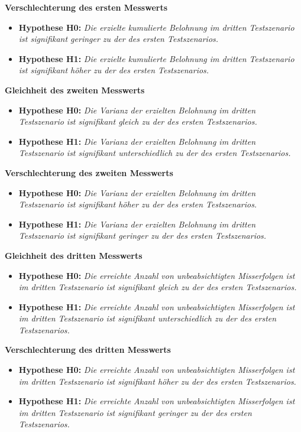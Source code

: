 \textbf{Verschlechterung des ersten Messwerts}
\begin{itemize}
    \item \textbf{Hypothese H0:} \textit{Die erzielte kumulierte Belohnung im dritten Testszenario ist signifikant geringer zu der des ersten Testszenarios.}
    \item \textbf{Hypothese H1:} \textit{Die erzielte kumulierte Belohnung im dritten Testszenario ist signifikant höher zu der des ersten Testszenarios.}
\end{itemize}

\textbf{Gleichheit des zweiten Messwerts}
\begin{itemize}
    \item \textbf{Hypothese H0:} \textit{Die Varianz der erzielten Belohnung im dritten Testszenario ist signifikant gleich zu der des ersten Testszenarios.}
    \item \textbf{Hypothese H1:} \textit{Die Varianz der erzielten Belohnung im dritten Testszenario ist signifikant unterschiedlich zu der des ersten Testszenarios.}
\end{itemize}

\textbf{Verschlechterung des zweiten Messwerts}
\begin{itemize}
    \item \textbf{Hypothese H0:} \textit{Die Varianz der erzielten Belohnung im dritten Testszenario ist signifikant höher zu der des ersten Testszenarios.}
    \item \textbf{Hypothese H1:} \textit{Die Varianz der erzielten Belohnung im dritten Testszenario ist signifikant geringer zu der des ersten Testszenarios.}
\end{itemize}

\textbf{Gleichheit des dritten Messwerts}
\begin{itemize}
    \item \textbf{Hypothese H0:} \textit{Die erreichte Anzahl von unbeabsichtigten Misserfolgen ist im dritten Testszenario ist signifikant gleich zu der des ersten Testszenarios.}
    \item \textbf{Hypothese H1:} \textit{Die erreichte Anzahl von unbeabsichtigten Misserfolgen ist im dritten Testszenario ist signifikant unterschiedlich zu der des ersten Testszenarios.}
\end{itemize}

\textbf{Verschlechterung des dritten Messwerts}
\begin{itemize}
    \item \textbf{Hypothese H0:} \textit{Die erreichte Anzahl von unbeabsichtigten Misserfolgen ist im dritten Testszenario ist signifikant höher zu der des ersten Testszenarios.}
    \item \textbf{Hypothese H1:} \textit{Die erreichte Anzahl von unbeabsichtigten Misserfolgen ist im dritten Testszenario ist signifikant geringer zu der des ersten Testszenarios.}
\end{itemize}

